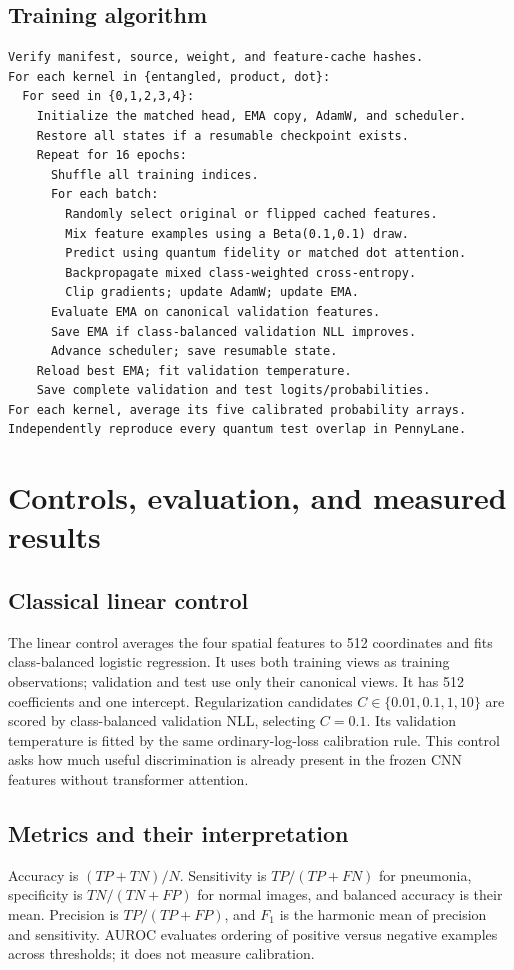 \documentclass[11pt,a4paper]{report}
\begin{document}
\section{Training algorithm}
\begin{lstlisting}[caption={Operational training sequence; the exact Python implementation is included in the appendix.}]
Verify manifest, source, weight, and feature-cache hashes.
For each kernel in {entangled, product, dot}:
  For seed in {0,1,2,3,4}:
    Initialize the matched head, EMA copy, AdamW, and scheduler.
    Restore all states if a resumable checkpoint exists.
    Repeat for 16 epochs:
      Shuffle all training indices.
      For each batch:
        Randomly select original or flipped cached features.
        Mix feature examples using a Beta(0.1,0.1) draw.
        Predict using quantum fidelity or matched dot attention.
        Backpropagate mixed class-weighted cross-entropy.
        Clip gradients; update AdamW; update EMA.
      Evaluate EMA on canonical validation features.
      Save EMA if class-balanced validation NLL improves.
      Advance scheduler; save resumable state.
    Reload best EMA; fit validation temperature.
    Save complete validation and test logits/probabilities.
For each kernel, average its five calibrated probability arrays.
Independently reproduce every quantum test overlap in PennyLane.
\end{lstlisting}

\chapter{Controls, evaluation, and measured results}
\section{Classical linear control}
The linear control averages the four spatial features to 512 coordinates and fits class-balanced logistic regression. It uses both training views as training observations; validation and test use only their canonical views. It has 512 coefficients and one intercept. Regularization candidates $C\in\{0.01,0.1,1,10\}$ are scored by class-balanced validation NLL, selecting $C=0.1$. Its validation temperature is fitted by the same ordinary-log-loss calibration rule. This control asks how much useful discrimination is already present in the frozen CNN features without transformer attention.

\section{Metrics and their interpretation}
Accuracy is $(TP+TN)/N$. Sensitivity is $TP/(TP+FN)$ for pneumonia, specificity is $TN/(TN+FP)$ for normal images, and balanced accuracy is their mean. Precision is $TP/(TP+FP)$, and $F_1$ is the harmonic mean of precision and sensitivity. AUROC evaluates ordering of positive versus negative examples across thresholds; it does not measure calibration.
\end{document}
